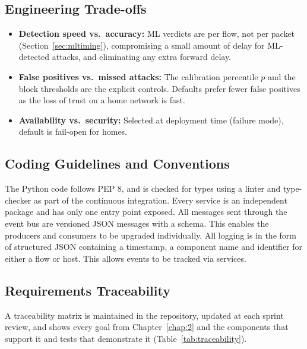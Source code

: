\subsection{Engineering Trade-offs}\label{sec:6.6.3}
\begin{itemize}
    \item \textbf{Detection speed vs.\ accuracy:} ML verdicts are per flow, not per packet (Section~\ref{sec:mltiming}), compromising a small amount of delay for ML-detected attacks, and eliminating any extra forward delay.
    \item \textbf{False positives vs.\ missed attacks:} The calibration percentile $p$ and the block thresholds are the explicit controls. Defaults prefer fewer false positives as the loss of trust on a home network is fast.
    \item \textbf{Availability vs.\ security:} Selected at deployment time (failure mode), default is fail-open for homes.
\end{itemize}

\subsection{Coding Guidelines and Conventions}\label{sec:6.6.4}
\noindent The Python code follows PEP 8, and is checked for types using a linter and type-checker as part of the continuous integration. Every service is an independent package and has only one entry point exposed. All messages sent through the event bus are versioned JSON messages with a schema. This enables the producers and consumers to be upgraded individually. All logging is in the form of structured JSON containing a timestamp, a component name and identifier for either a flow or host. This allows events to be tracked via services.

\subsection{Requirements Traceability}\label{sec:6.6.5}
\noindent A traceability matrix is maintained in the repository, updated at each sprint review, and shows every goal from Chapter~\ref{chap:2} and the components that support it and tests that demonstrate it (Table~\ref{tab:traceability}).

